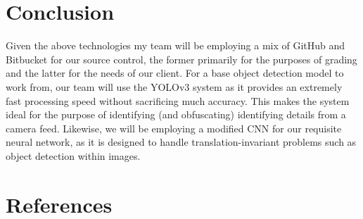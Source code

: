 \documentclass[onecolumn, draftclsnofoot,10pt, compsoc]{IEEEtran}
\begin{document}
\section{Conclusion}
Given the above technologies my team will be employing a mix of GitHub and Bitbucket for our source control, the former primarily for the purposes of grading and the latter for the needs of our client. For a base object detection model to work from, our team will use the YOLOv3 system as it provides an extremely fast processing speed without sacrificing much accuracy. This makes the system ideal for the purpose of identifying (and obfuscating) identifying details from a camera feed. Likewise, we will be employing a modified CNN for our requisite neural network, as it is designed to handle translation-invariant problems such as object detection within images.
\section{References}
\let\oldaddcontentsline\addcontentsline%
\renewcommand{\addcontentsline}[3]{}%
  

\let\addcontentsline\oldaddcontentsline%
\end{document}
